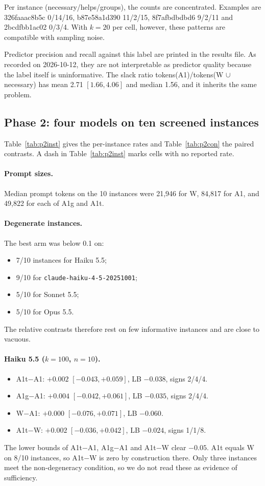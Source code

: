 Per instance (necessary/helps/groups), the counts are concentrated. Examples are 326faaac8b5c 0/14/16, b87e58a1d390 11/2/15, 8f7afbdbdbd6 9/2/11 and 2bcdfbb1ac02 0/3/4. With $k=20$ per cell, however, these patterns are compatible with sampling noise.

Predictor precision and recall against this label are printed in the results file. As recorded on 2026-10-12, they are not interpretable as predictor quality because the label itself is uninformative. The slack ratio tokens(A1)/tokens(W $\cup$ necessary) has mean 2.71 $[1.66, 4.06]$ and median 1.56, and it inherits the same problem.

\subsection{Phase 2: four models on ten screened instances}

Table~\ref{tab:p2inst} gives the per-instance rates and Table~\ref{tab:p2con} the paired contrasts. A dash in Table~\ref{tab:p2inst} marks cells with no reported rate.

\paragraph{Prompt sizes.} Median prompt tokens on the 10 instances were 21,946 for W, 84,817 for A1, and 49,822 for each of A1g and A1t.

\paragraph{Degenerate instances.} The best arm was below 0.1 on:
\begin{itemize}
\item 7/10 instances for Haiku 5.5;
\item 9/10 for \texttt{claude-haiku-4-5-20251001};
\item 5/10 for Sonnet 5.5;
\item 5/10 for Opus 5.5.
\end{itemize}
The relative contrasts therefore rest on few informative instances and are close to vacuous.

\paragraph{Haiku 5.5 ($k=100$, $n=10$).}
\begin{itemize}
\item A1t$-$A1: $+0.002$ $[-0.043, +0.059]$, LB $-0.038$, signs 2/4/4.
\item A1g$-$A1: $+0.004$ $[-0.042, +0.061]$, LB $-0.035$, signs 2/4/4.
\item W$-$A1: $+0.000$ $[-0.076, +0.071]$, LB $-0.060$.
\item A1t$-$W: $+0.002$ $[-0.036, +0.042]$, LB $-0.024$, signs 1/1/8.
\end{itemize}
The lower bounds of A1t$-$A1, A1g$-$A1 and A1t$-$W clear $-0.05$. A1t equals W on 8/10 instances, so A1t$-$W is zero by construction there. Only three instances meet the non-degeneracy condition, so we do not read these as evidence of sufficiency.

